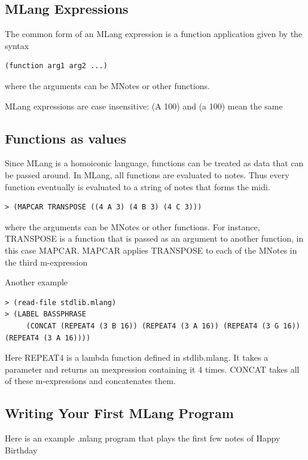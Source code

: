 \documentclass[letterpaper,11pt]{article}
\begin{document}
{\subsection{MLang Expressions}

The common form of an MLang expression is a function application given by the syntax

\lstset{breaklines=true,language=Lisp}
\begin{lstlisting}
(function arg1 arg2 ...)
\end{lstlisting}
where the arguments can be MNotes or other functions.

MLang expressions are case insensitive: (A 100) and (a 100) mean the same

\subsection{Functions as values}

Since MLang is a homoiconic language, functions can be treated as data that can be passed around.
In MLang, all functions are evaluated to notes. Thus every function eventually is evaluated to a string of notes that forms the midi.

\lstset{breaklines=true,language=Lisp}
\begin{lstlisting}
> (MAPCAR TRANSPOSE ((4 A 3) (4 B 3) (4 C 3)))
\end{lstlisting}

where the arguments can be MNotes or other functions.
For instance, TRANSPOSE is a function that is passed as an argument to another function, in this case MAPCAR. MAPCAR applies TRANSPOSE to each
of the MNotes in the third m-expression

Another example
\lstset{breaklines=true,language=Lisp}
\begin{lstlisting}
> (read-file stdlib.mlang)
> (LABEL BASSPHRASE
  	 (CONCAT (REPEAT4 (3 B 16)) (REPEAT4 (3 A 16)) (REPEAT4 (3 G 16)) (REPEAT4 (3 A 16))))
\end{lstlisting}

Here REPEAT4 is a lambda function defined in stdlib.mlang. It takes a parameter and returns an mexpression containing it 4 times. CONCAT takes
all of these m-expressions and concatenates them.


\subsection{Writing Your First MLang Program}
Here is an example .mlang program that plays the first few notes of Happy Birthday

}
\end{document}
